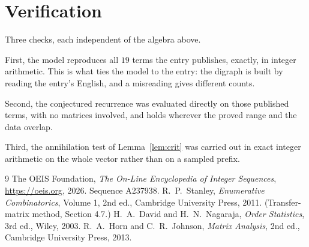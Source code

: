 \documentclass[11pt,a4paper]{article}
\theoremstyle{plain}
\theoremstyle{definition}
\begin{document}
\section{Verification}

Three checks, each independent of the algebra above.

First, the model reproduces all $19$ terms the entry publishes, exactly, in integer
arithmetic. This is what ties the model to the entry: the digraph is built by reading the
entry's English, and a misreading gives different counts.

Second, the conjectured recurrence was evaluated directly on those published terms, with no
matrices involved, and holds wherever the proved range and the data overlap.

Third, the annihilation test of Lemma~\ref{lem:crit} was carried out in exact integer
arithmetic on the whole vector rather than on a sampled prefix.

\begin{thebibliography}{9}
 The OEIS Foundation, \emph{The On-Line Encyclopedia of Integer
Sequences}, \url{https://oeis.org}, 2026. Sequence A237938.
 R.~P.~Stanley, \emph{Enumerative Combinatorics}, Volume 1, 2nd ed.,
Cambridge University Press, 2011. (Transfer-matrix method, Section 4.7.)
 H.~A.~David and H.~N.~Nagaraja, \emph{Order Statistics}, 3rd ed., Wiley,
2003.
 R.~A.~Horn and C.~R.~Johnson, \emph{Matrix Analysis}, 2nd ed., Cambridge
University Press, 2013.
\end{thebibliography}
\end{document}
